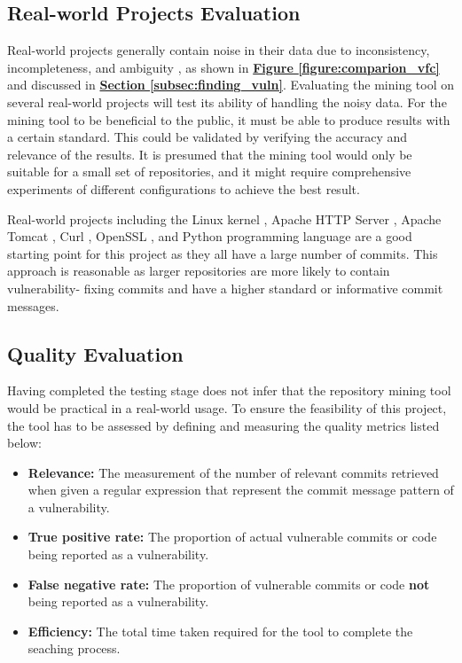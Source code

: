\documentclass[12pt, a4paper]{report}
\begin{document}
\subsection{Real-world Projects Evaluation} \label{sec:realworld}
Real-world projects generally contain noise in their data due to inconsistency, incompleteness, and
ambiguity \cite{alqahtani_2016}, as shown in \hyperref[figure:comparion_vfc]{\textbf{Figure
\ref*{figure:comparion_vfc}}} and discussed in \hyperref[subsec:finding_vuln]{\textbf{Section
\ref*{subsec:finding_vuln}}}. Evaluating the mining tool on several real-world projects will test
its ability of handling the noisy data. For the mining tool to be beneficial to the public, it must
be able to produce results with a certain standard. This could be validated by verifying the
accuracy and relevance of the results. It is presumed that the mining tool would only be suitable
for a small set of repositories, and it might require comprehensive experiments of different
configurations to achieve the best result.

Real-world projects including the Linux kernel \cite{linux_repo}, Apache HTTP Server
\cite{apache_httpd_repo}, Apache Tomcat \cite{apache_tomcat_repo}, Curl \cite{curl_repo}, OpenSSL
\cite{openssl_repo}, and Python programming language \cite{cpython_repo} are a good starting point
for this project as they all have a large number of commits. This approach is reasonable as larger
repositories are more likely to contain vulnerability- fixing commits and have a higher standard or
informative commit messages.

\subsection{Quality Evaluation}
Having completed the testing stage does not infer that the repository mining tool would be practical
in a real-world usage. To ensure the feasibility of this project, the tool has to be assessed by
defining and measuring the quality metrics listed below:

\begin{itemize}
  \item \textbf{Relevance:} The measurement of the number of relevant commits retrieved when given a
  regular expression that represent the commit message pattern of a vulnerability.
  \item \textbf{True positive rate:} The proportion of actual vulnerable commits or code being
  reported as a vulnerability.
  \item \textbf{False negative rate:} The proportion of vulnerable commits or code \textbf{not}
  being reported as a vulnerability.
  \item \textbf{Efficiency:} The total time taken required for the tool to complete the seaching
  process.
\end{itemize}
\end{document}
